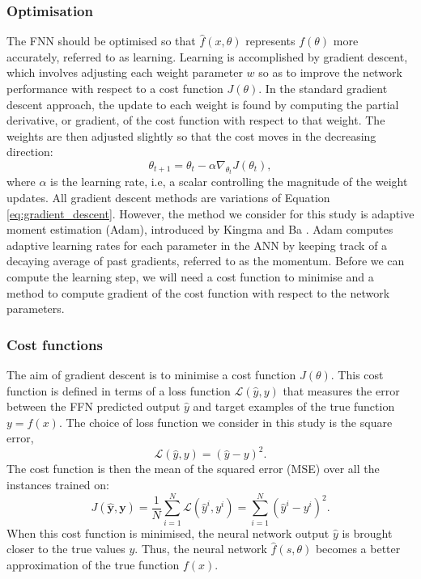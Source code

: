 \subsubsection{Optimisation}
The FNN should be optimised so that $\hat{f}(x,\theta)$ represents $f(\theta)$ more accurately, referred to as learning. 
Learning is accomplished by gradient descent, which involves adjusting each weight parameter $w$ so as to improve the network performance with respect to a cost function $J(\theta)$. 
In the standard gradient descent approach, the update to each weight is found by computing the partial derivative, or gradient, of the cost function with respect to that weight. The weights are then adjusted slightly so that the cost moves in the decreasing direction:
\begin{equation}
    \theta_{t+1} = \theta_{t} - \alpha \nabla_{\theta_t}J(\theta_t),
    \label{eq:gradient_descent}
\end{equation}
where $\alpha$ is the learning rate, i.e, a scalar controlling the magnitude of the weight updates.
All gradient descent methods are variations of Equation \ref{eq:gradient_descent}.
However, the method we consider for this study is adaptive moment estimation (Adam), introduced by Kingma and Ba \cite{kingma2015}. 
Adam computes adaptive learning rates for each parameter in the ANN by keeping track of a decaying average of past gradients, referred to as the momentum. 
Before we can compute the learning step, we will need a cost function to minimise and a method to compute gradient of the cost function with respect to the network parameters.

\subsubsection{Cost functions}
The aim of gradient descent is to minimise a cost function $J(\theta)$. This cost function is defined in terms of a loss function $\mathcal{L}(\hat{y}, y)$ that measures the error between the FFN predicted output $\hat{y}$ and target examples of the true function $y = f(x)$. 
The choice of loss function we consider in this study is the square error, 
\begin{equation}
    \mathcal{L}(\hat{y},y)=(\hat{y}-y)^2.
\end{equation}
The cost function is then the mean of the squared error (MSE) over all the instances trained on:
\begin{equation}
    J(\mathbf{\hat{y}, y}) = \frac{1}{N} \sum_{i=1}^{N} \mathcal{L}(\hat{y}^i, y^i) = \sum_{i=1}^{N} (\hat{y}^i - y^i)^2.
    \label{eq:cost_function}
\end{equation}
When this cost function is minimised, the neural network output $\hat{y}$ is brought closer to the true values $y$.
Thus, the neural network $\hat{f}(s,\theta)$ becomes a better approximation of the true function $f(x)$.

